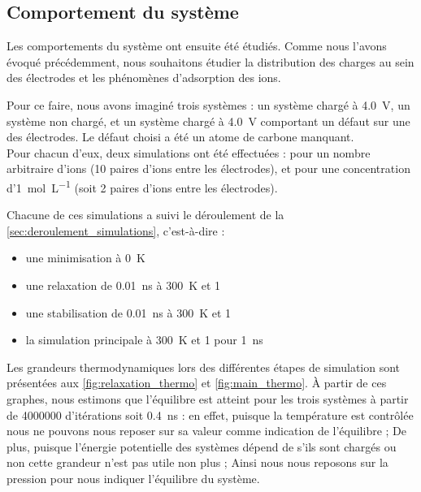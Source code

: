     \subsection{Comportement du système}

Les comportements du système ont ensuite été étudiés. Comme nous l'avons évoqué précédemment, nous souhaitons étudier la distribution des charges au sein des électrodes et les phénomènes d'adsorption des ions.

Pour ce faire, nous avons imaginé trois systèmes : un système chargé à \qty{4.0}{\volt}, un système non chargé, et un système chargé à \qty{4.0}{\volt} comportant un défaut sur une des électrodes. Le défaut choisi a été un atome de carbone manquant.\\
Pour chacun d'eux, deux simulations ont été effectuées : pour un nombre arbitraire d'ions (\num{10} paires d'ions entre les électrodes), et pour une concentration d'\qty{1}{\mole \per \liter} (soit \num{2} paires d'ions entre les électrodes).

Chacune de ces simulations a suivi le déroulement de la \autoref{sec:deroulement_simulations}, c'est-à-dire :
\begin{itemize}
    \item une minimisation à \qty{0}{\kelvin}
    \item une relaxation de \qty{0.01}{\nano \second} à \qty{300}{\kelvin} et \qty{1}{\atm}
    \item une stabilisation de \qty{0.01}{\nano \second} à \qty{300}{\kelvin} et \qty{1}{\atm}
    \item la simulation principale à \qty{300}{\kelvin} et \qty{1}{\atm} pour \qty{1}{\nano \second}
\end{itemize}

Les grandeurs thermodynamiques lors des différentes étapes de simulation sont présentées aux \autoref{fig:relaxation_thermo} et \ref{fig:main_thermo}. À partir de ces graphes, nous estimons que l'équilibre est atteint pour les trois systèmes à partir de \num{4000000} d'itérations soit \qty{0.4}{\nano \second} : en effet, puisque la température est contrôlée nous ne pouvons nous reposer sur sa valeur comme indication de l'équilibre ; De plus, puisque l'énergie potentielle des systèmes dépend de s'ils sont chargés ou non cette grandeur n'est pas utile non plus ; Ainsi nous nous reposons sur la pression pour nous indiquer l'équilibre du système.


